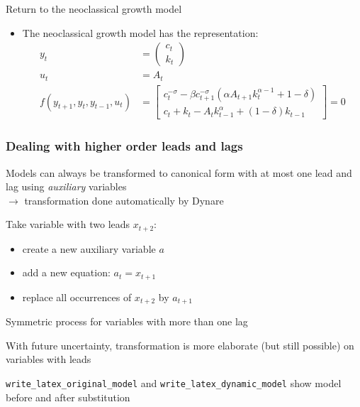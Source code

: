 \documentclass[handout,usepdftitle=false,xcolor=dvipsnames,aspectratio=169]{beamer}
\begin{document}
\begin{frame}{Return to the neoclassical growth model}
  \begin{itemize}
    \item The neoclassical growth model has the representation:
          \begin{align}
            y_t                           & = \left(\begin{array}{c}
                                                        c_t \\
                                                        k_t
                                                      \end{array}
            \right)                                                                                                                           \\
            u_t                           & = A_t                                                                                             \\
            f(y_{t+1}, y_t, y_{t-1}, u_t) & = \left[\begin{array}{l}
                                                        c_t^{-\sigma} - \beta c_{t+1}^{-\sigma}\left(\alpha A_{t+1}k_t^{\alpha-1}+1-\delta\right) \\
                                                        c_t+k_t - A_t k_{t-1}^\alpha + (1-\delta)k_{t-1}
                                                      \end{array}\right]=0
          \end{align}

  \end{itemize}
\end{frame}

\begin{frame}
  \frametitle{Dealing with higher order leads and lags}

  \begin{witemize}
    \item Models can always be transformed to canonical form with at most one lead and lag using \textit{auxiliary} variables\\
    $\rightarrow$ transformation done automatically by Dynare
    \item Take variable with two leads $x_{t+2}$:
    \begin{itemize}
      \item create a new auxiliary variable $a$
      \item add a new equation: $a_t = x_{t+1}$
      \item replace all occurrences of $x_{t+2}$ by $a_{t+1}$
    \end{itemize}
    \item Symmetric process for variables with more than one lag
    \item With future uncertainty, transformation is more elaborate
    (but still possible) on variables with leads
    \item \texttt{write\_latex\_original\_model}  and \texttt{write\_latex\_dynamic\_model} show model before and after substitution
  \end{witemize}
\end{frame}
\end{document}
